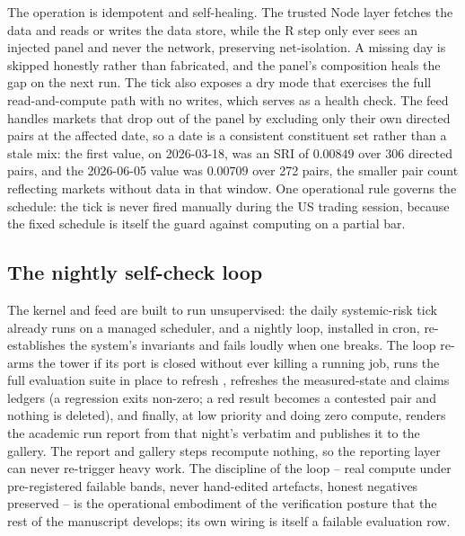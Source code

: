 The operation is idempotent and self-healing. The trusted Node layer fetches the
data and reads or writes the data store, while the R step only ever sees an injected
panel and never the network, preserving net-isolation. A missing day is skipped
honestly rather than fabricated, and the panel's composition heals the gap on the
next run. The tick also exposes a dry mode that exercises the full read-and-compute
path with no writes, which serves as a health check. The feed handles markets that
drop out of the panel by excluding only their own directed pairs at the affected
date, so a date is a consistent constituent set rather than a stale mix: the first
value, on 2026-03-18, was an SRI of $0.00849$ over 306 directed pairs, and the
2026-06-05 value was $0.00709$ over 272 pairs, the smaller pair count reflecting
markets without data in that window. One operational rule governs the schedule: the
tick is never fired manually during the US trading session, because the fixed
schedule is itself the guard against computing on a partial bar.

\subsection{The nightly self-check loop}
\label{sec:nightly}

The kernel and feed are built to run unsupervised: the daily systemic-risk tick
already runs on a managed scheduler, and a nightly loop, installed in cron,
re-establishes the system's invariants and fails loudly when one breaks. The loop re-arms
the tower if its port is closed without ever killing a running job, runs the full
evaluation suite in place to refresh , refreshes the measured-state
and claims ledgers (a regression exits non-zero; a red result becomes a contested
pair and nothing is deleted), and finally, at low priority and doing zero compute,
renders the academic run report from that night's  verbatim and
publishes it to the gallery. The report and gallery steps recompute nothing, so the
reporting layer can never re-trigger heavy work. The discipline of the loop -- real
compute under pre-registered failable bands, never hand-edited artefacts, honest
negatives preserved -- is the operational embodiment of the verification posture
that the rest of the manuscript develops; its own wiring is itself a failable
evaluation row.
